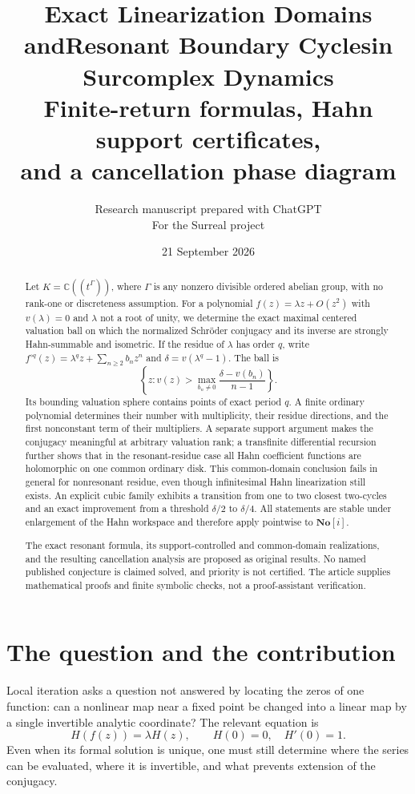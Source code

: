 \documentclass[11pt,letterpaper]{article}
\title{\textbf{Exact Linearization Domains and\newline Resonant Boundary Cycles\newline in Surcomplex Dynamics}\\[8pt]
\large Finite-return formulas, Hahn support certificates,\\
and a cancellation phase diagram}
\author{Research manuscript prepared with ChatGPT\\
\small For the Surreal project}
\date{21 September 2026}
\numberwithin{equation}{section}
\theoremstyle{plain}
\theoremstyle{definition}
\theoremstyle{remark}
\newcommand{\C}{\mathbb C}
\newcommand{\No}{\mathbf{No}}
\begin{document}
\maketitle
\thispagestyle{empty}
\begin{abstract}
Let $K=\C((t^\Gamma))$, where $\Gamma$ is any nonzero divisible ordered
abelian group, with no rank-one or discreteness assumption. For a polynomial
$f(z)=\lambda z+O(z^2)$ with $v(\lambda)=0$ and $\lambda$ not a root of unity,
we determine the exact maximal centered valuation ball on which the normalized
Schr\"oder conjugacy and its inverse are strongly Hahn-summable and isometric.
If the residue of $\lambda$ has order $q$, write
$f^{\circ q}(z)=\lambda^qz+\sum_{n\ge2}b_nz^n$ and
$\delta=v(\lambda^q-1)$. The ball is
\[
 \left\{z:v(z)>\max_{b_n\ne0}\frac{\delta-v(b_n)}{n-1}\right\}.
\]
Its bounding valuation sphere contains points of exact period $q$.
A finite ordinary polynomial determines their number with multiplicity,
their residue directions, and the first nonconstant term of their
multipliers. A separate support argument makes the conjugacy meaningful at
arbitrary valuation rank; a transfinite differential recursion further shows
that in the resonant-residue case all Hahn coefficient functions are
holomorphic on one common ordinary disk. This common-domain conclusion fails
in general for nonresonant residue, even though infinitesimal Hahn
linearization still exists. An explicit cubic family exhibits a transition
from one to two closest two-cycles and an exact improvement from a threshold
$\delta/2$ to $\delta/4$. All statements are stable under enlargement of the
Hahn workspace and therefore apply pointwise to $\No[i]$.

The exact resonant formula, its support-controlled and common-domain
realizations, and the resulting cancellation analysis are proposed as original
results. No named published conjecture is claimed solved, and priority is not
certified. The article supplies mathematical proofs and finite symbolic checks,
not a proof-assistant verification.
\end{abstract}

\newpage
{\small\setlength{\parskip}{0pt}\tableofcontents}
\newpage

\section{The question and the contribution}\label{sec:intro}

Local iteration asks a question not answered by locating the zeros of one
function: can a nonlinear map near a fixed point be changed into a linear map
by a single invertible analytic coordinate? The relevant equation is
\begin{equation}\label{eq:schroeder-intro}
 H(f(z))=\lambda H(z),\qquad H(0)=0,\quad H'(0)=1.
\end{equation}
Even when its formal solution is unique, one must still determine where the
series can be evaluated, where it is invertible, and what prevents extension
of the conjugacy.
\end{document}
